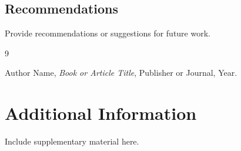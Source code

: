 \documentclass[12pt,a4paper]{report}
\begin{document}
\section{Recommendations}

Provide recommendations or suggestions for future work.

\begin{thebibliography}{9}

Author Name,
\textit{Book or Article Title},
Publisher or Journal, Year.

\end{thebibliography}

\appendix

\chapter{Additional Information}

Include supplementary material here.
\end{document}
